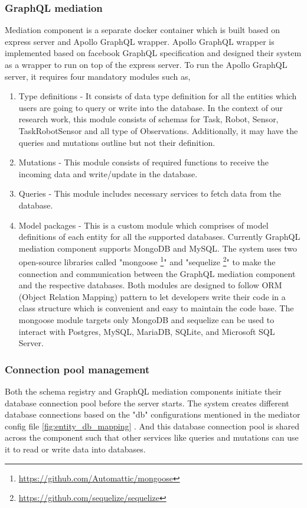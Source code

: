 	\subsubsection{GraphQL mediation}
	Mediation component is a separate docker container which is built based on express server and Apollo GraphQL wrapper. Apollo GraphQL wrapper is implemented based on facebook GraphQL specification and designed their system as a wrapper to run on top of the express server. To run the Apollo GraphQL server, it requires four mandatory modules such as,
	\begin{enumerate}
		\item Type definitions - It consists of data type definition for all the entities which users are going to query or write into the database. In the context of our research work, this module consists of schemas for Task, Robot, Sensor, TaskRobotSensor and all type of Observations. Additionally, it may have the queries and mutations outline but not their definition.
		\item Mutations - This module consists of required functions to receive the incoming data and write/update in the database.
		\item Queries - This module includes necessary services to fetch data from the database.  
		\item Model packages - This is a custom module which comprises of model definitions of each entity for all the supported databases. Currently GraphQL mediation component supports MongoDB and MySQL. The system uses two open-source libraries called "mongoose \footnote{ \url{https://github.com/Automattic/mongoose}}" and "sequelize \footnote{ \url{https://github.com/sequelize/sequelize}}" to make the connection and communication between the GraphQL mediation component and the respective databases. Both modules are designed to follow ORM (Object Relation Mapping) pattern to let developers write their code in a class structure which is convenient and easy to maintain the code base. The mongoose module targets only MongoDB and sequelize can be used to interact with Postgres, MySQL, MariaDB, SQLite, and Microsoft SQL Server.		
	\end{enumerate}

	\subsubsection{Connection pool management} 
	Both the schema registry and GraphQL mediation components initiate their database connection pool before the server starts. The system creates different database connections based on the "db" configurations mentioned in the mediator config file \ref{fig:entity_db_mapping} . And this database connection pool is shared across the component such that other services like queries and mutations can use it to read or write data into databases.
	
